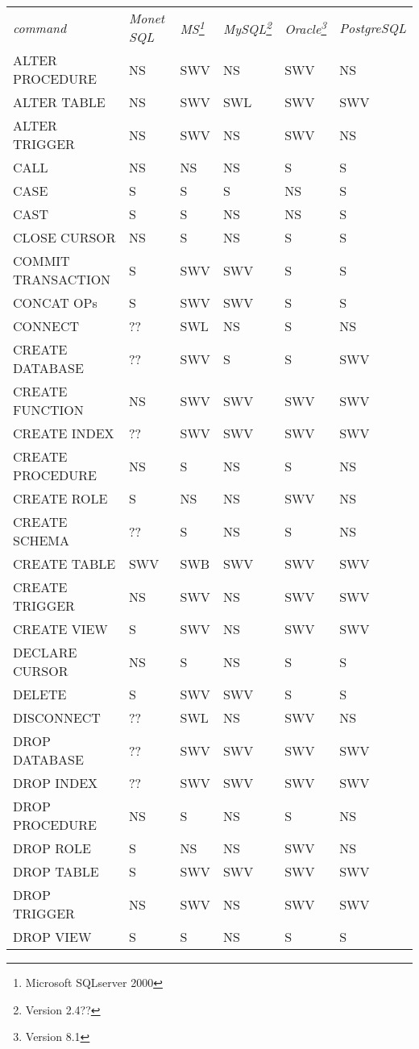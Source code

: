 \documentclass[10pt,twocolumn,fleqn]{article}
\begin{document}
\begin{tabular}{l l| l|l|l|l}
{\em command} & {\em Monet SQL}& {\em MS\footnote{Microsoft SQLserver 2000}} & {\em MySQL\footnote{Version 2.4??}} & {\em Oracle\footnote{Version 8.1}} & {\em PostgreSQL}\\
ALTER PROCEDURE & NS	& SWV	& NS	& SWV	& NS\\
ALTER TABLE & NS	& SWV	& SWL	& SWV	& SWV\\
ALTER TRIGGER & NS	& SWV	& NS	& SWV	& NS\\
CALL	&	NS	& NS	& NS	& S	& S\\
CASE	&	S	& S	& S	& NS	& S\\
CAST	&	S	& S	& NS	& NS	& S\\
CLOSE CURSOR &	NS	& S	& NS	& S	& S\\
COMMIT TRANSACTION &S	& SWV	& SWV	& S	& S\\
CONCAT OPs&	S 	& SWV	& SWV	& S	& S\\
CONNECT & 	??	&SWL	& NS	& S	& NS\\
CREATE DATABASE& ??	& SWV	& S 	& S	& SWV\\
CREATE FUNCTION& NS	& SWV	& SWV	& SWV	& SWV\\
CREATE INDEX&	??	& SWV	& SWV   & SWV	& SWV\\
CREATE PROCEDURE& NS	& S	& NS	& S	& NS\\
CREATE ROLE&	S	& NS	& NS	& SWV	& NS\\
CREATE SCHEMA& ??	& S	& NS	& S	& NS\\
CREATE TABLE& SWV	& SWB	& SWV	& SWV	& SWV\\
CREATE TRIGGER& NS	& SWV	& NS	& SWV	& SWV\\
CREATE VIEW & 	S	& SWV 	& NS	& SWV	& SWV\\
DECLARE CURSOR& NS	& S	& NS	& S	& S\\
DELETE	&	S	& SWV	& SWV	& S	& S\\
DISCONNECT&	??	& SWL	& NS	& SWV	& NS\\
DROP DATABASE&	??	& SWV 	& SWV	& SWV	& SWV\\
DROP INDEX&	??	& SWV	& SWV	& SWV	& SWV\\
DROP PROCEDURE&	NS	& S	& NS	& S	& NS\\
DROP ROLE&	S	& NS	& NS	& SWV 	& NS\\
DROP TABLE&	S	& SWV	& SWV	& SWV	& SWV\\
DROP TRIGGER& 	NS	& SWV	& NS	& SWV	& SWV\\
DROP VIEW&	S	& S	& NS	& S	& S\\

\end{tabular}
\end{document}
